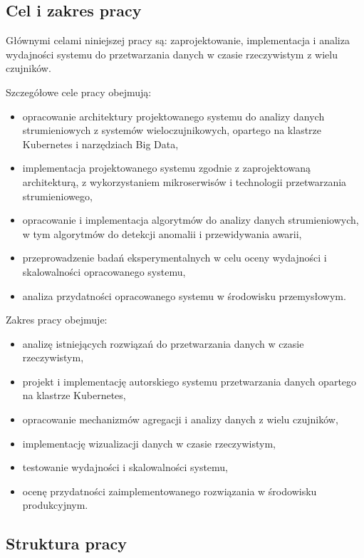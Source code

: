 \subsection{Cel i zakres pracy}
\label{subsec:cel}

Głównymi celami niniejszej pracy są: zaprojektowanie, implementacja i analiza wydajności systemu do przetwarzania danych w
czasie rzeczywistym z wielu czujników.

\vspace{0.3em}

Szczegółowe cele pracy obejmują:
\begin{itemize}
    \item opracowanie architektury projektowanego systemu do analizy danych strumieniowych z systemów wieloczujnikowych, opartego na klastrze Kubernetes i narzędziach Big Data,
    \item implementacja projektowanego systemu zgodnie z zaprojektowaną architekturą, z wykorzystaniem mikroserwisów i technologii przetwarzania strumieniowego,
    \item opracowanie i implementacja algorytmów do analizy danych strumieniowych, w tym algorytmów do detekcji anomalii i przewidywania awarii,
    \item przeprowadzenie badań eksperymentalnych w celu oceny wydajności i skalowalności opracowanego systemu,
    \item analiza przydatności opracowanego systemu w środowisku przemysłowym.
\end{itemize}

\newpage

Zakres pracy obejmuje:
\begin{itemize}
    \item analizę istniejących rozwiązań do przetwarzania danych w czasie rzeczywistym,
    \item projekt i implementację autorskiego systemu przetwarzania danych opartego na klastrze Kubernetes,
    \item opracowanie mechanizmów agregacji i analizy danych z wielu czujników,
    \item implementację wizualizacji danych w czasie rzeczywistym,
    \item testowanie wydajności i skalowalności systemu,
    \item ocenę przydatności zaimplementowanego rozwiązania w środowisku produkcyjnym.
\end{itemize}

\subsection{Struktura pracy}
\label{subsec:struktura}

